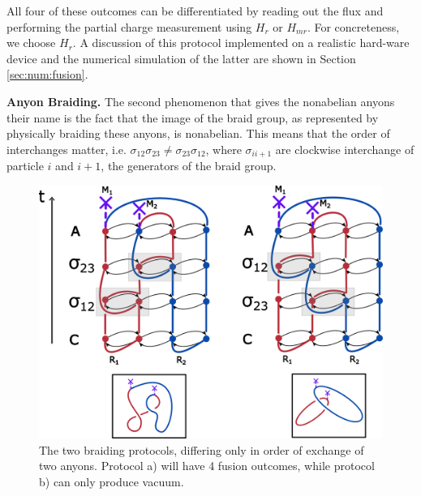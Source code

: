 \documentclass[two column]{article}
\begin{document}
All four of these outcomes can be differentiated by reading out the flux and performing the partial charge measurement using $H_r$ or $H_{mr}$. For concreteness, we choose $H_r$. A discussion of this protocol implemented on a realistic hard-ware device and the numerical simulation of the latter are shown in Section \ref{sec:num:fusion}.



%

\textbf{Anyon Braiding.} The second phenomenon that gives the nonabelian anyons their name is the fact that the image of the braid group, as represented by physically braiding these anyons, is nonabelian. 
This means that the order of interchanges matter, i.e. $\sigma_{12}\sigma_{23} \neq \sigma_{23}\sigma_{12}$, where $\sigma_{ii+1}$ are clockwise interchange of particle $i$ and $i+1$, the generators of the braid group.


\begin{figure}
    \centering
    \includegraphics[width=\linewidth]{Figures/fluxBRAID.pdf}
    \caption{The two braiding protocols, differing only in order of exchange of two anyons. Protocol a) will have 4 fusion outcomes, while protocol b) can only produce vacuum.}
    \label{fig:flux_braid}
\end{figure}
\end{document}
